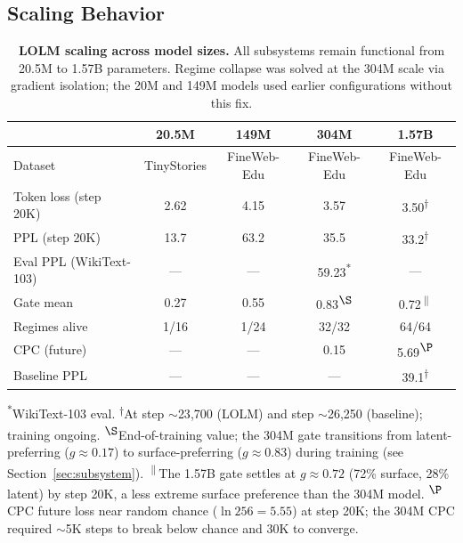 \documentclass{article}
\begin{document}
\subsection{Scaling Behavior}
\label{sec:scaling}

\begin{table}[t]
\centering
\caption{\textbf{LOLM scaling across model sizes.} All subsystems remain
functional from 20.5M to 1.57B parameters. Regime collapse was solved at
the 304M scale via gradient isolation; the 20M and 149M models used earlier
configurations without this fix.}
\label{tab:scaling}
\vspace{0.5em}
\begin{tabular}{lcccc}
\toprule
& \textbf{20.5M} & \textbf{149M} & \textbf{304M} & \textbf{1.57B} \\
\midrule
Dataset & TinyStories & FineWeb-Edu & FineWeb-Edu & FineWeb-Edu \\
Token loss (step 20K) & 2.62 & 4.15 & 3.57 & 3.50\textsuperscript{$\dagger$} \\
PPL (step 20K) & 13.7 & 63.2 & 35.5 & 33.2\textsuperscript{$\dagger$} \\
Eval PPL (WikiText-103) & --- & --- & 59.23\textsuperscript{*} & --- \\
Gate mean & 0.27 & 0.55 & 0.83\textsuperscript{$\S$} & 0.72\textsuperscript{$\|$} \\
Regimes alive & 1/16 & 1/24 & 32/32 & 64/64 \\
CPC (future) & --- & --- & 0.15 & 5.69\textsuperscript{$\P$} \\
Baseline PPL & --- & --- & --- & 39.1\textsuperscript{$\dagger$} \\
\bottomrule
\end{tabular}

{\footnotesize \textsuperscript{*}WikiText-103 eval. \textsuperscript{$\dagger$}At step ${\sim}$23{,}700 (LOLM) and step ${\sim}$26{,}250 (baseline); training ongoing. \textsuperscript{$\S$}End-of-training value; the 304M gate transitions from latent-preferring ($g{\approx}0.17$) to surface-preferring ($g{\approx}0.83$) during training (see Section~\ref{sec:subsystem}). \textsuperscript{$\|$}The 1.57B gate settles at $g{\approx}0.72$ (72\% surface, 28\% latent) by step 20K, a less extreme surface preference than the 304M model. \textsuperscript{$\P$}CPC future loss near random chance ($\ln 256 = 5.55$) at step 20K; the 304M CPC required ${\sim}$5K steps to break below chance and 30K to converge.}
\end{table}
\end{document}
